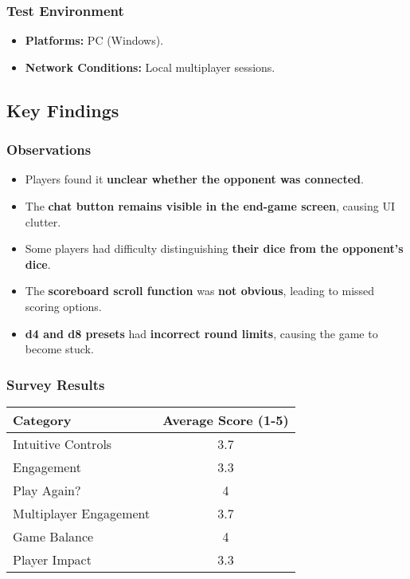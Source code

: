 \documentclass{article}
\begin{document}
\subsubsection{Test Environment}
\begin{itemize}
    \item \textbf{Platforms:} PC (Windows).
    \item \textbf{Network Conditions:} Local multiplayer sessions.
\end{itemize}

\subsection{Key Findings}
\subsubsection{Observations}
\begin{itemize}
    \item Players found it \textbf{unclear whether the opponent was connected}.
    \item The \textbf{chat button remains visible in the end-game screen}, causing UI clutter.
    \item Some players had difficulty distinguishing \textbf{their dice from the opponent's dice}.
    \item The \textbf{scoreboard scroll function} was \textbf{not obvious}, leading to missed scoring options.
    \item \textbf{d4 and d8 presets} had \textbf{incorrect round limits}, causing the game to become stuck.
\end{itemize}

\subsubsection{Survey Results}
\begin{longtable}{|p{7cm}|c|}
\hline
\textbf{Category} & \textbf{Average Score (1-5)} \\
\hline
Intuitive Controls & 3.7 \\
\hline
Engagement & 3.3 \\
\hline
Play Again? & 4 \\
\hline
Multiplayer Engagement & 3.7 \\
\hline
Game Balance & 4 \\
\hline
Player Impact & 3.3 \\
\hline
\end{longtable}
\end{document}
